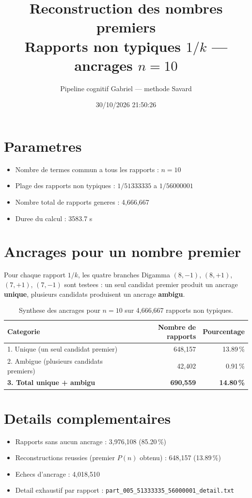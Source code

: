 \documentclass[12pt]{article}
\title{Reconstruction des nombres premiers\\Rapports non typiques $1/k$ --- ancrages $n=10$
}
\author{Pipeline cognitif Gabriel --- methode Savard}
\date{30/10/2026 21:50:26}
\begin{document}
\maketitle

\section*{Parametres}
\begin{itemize}
\item Nombre de termes commun a tous les rapports : $n=10$
\item Plage des rapports non typiques : $1/51333335$ a $1/56000001$
\item Nombre total de rapports generes : 4,666,667
\item Duree du calcul : 3583.7 s
\end{itemize}

\section*{Ancrages pour un nombre premier}

Pour chaque rapport $1/k$, les quatre branches Digamma $(8,-1)$, $(8,+1)$, $(7,+1)$, $(7,-1)$ sont testees : un seul candidat premier produit un ancrage \textbf{unique}, plusieurs candidats produisent un ancrage \textbf{ambigu}.

\begin{table}[h!]
\centering
\caption{Synthese des ancrages pour $n=10$ sur 4,666,667 rapports non typiques.}
\begin{tabular}{lrr}
\toprule
\textbf{Categorie} & \textbf{Nombre de rapports} & \textbf{Pourcentage} \\
\midrule
1. Unique (un seul candidat premier) & 648,157 & 13.89\,\% \\
2. Ambigue (plusieurs candidats premiers) & 42,402 & 0.91\,\% \\
\midrule
\textbf{3. Total unique + ambigu} & \textbf{690,559} & \textbf{14.80\,\%} \\
\bottomrule
\end{tabular}
\end{table}

\section*{Details complementaires}
\begin{itemize}
\item Rapports sans aucun ancrage : 3,976,108 (85.20\,\%)
\item Reconstructions reussies (premier $P(n)$ obtenu) : 648,157 (13.89\,\%)
\item Echecs d'ancrage : 4,018,510
\item Detail exhaustif par rapport : \texttt{part_005_51333335_56000001_detail.txt}
\end{itemize}
\end{document}
